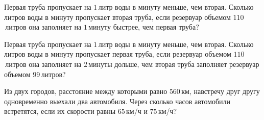 \begin{class}[number=4]
\begin{listofex}
		\item Первая труба пропускает на \(1\) литр воды в минуту меньше, чем вторая. Сколько литров воды в минуту пропускает вторая труба, если резервуар объемом \(110\) литров она заполняет на \(1\) минуту быстрее, чем первая труба?
		\item Первая труба пропускает на \(1\) литр воды в минуту меньше, чем вторая. Сколько литров воды в минуту пропускает первая труба, если резервуар объемом \(110\) литров она заполняет на \(2\) минуты дольше, чем вторая труба заполняет резервуар объемом \(99\) литров?
		\item Из двух городов, расстояние между которыми равно \(560\) км, навстречу друг другу одновременно выехали два автомобиля. Через сколько часов автомобили встретятся, если их скорости равны \(65\) км/ч и \(75\) км/ч?
	\end{listofex}
\end{class}

